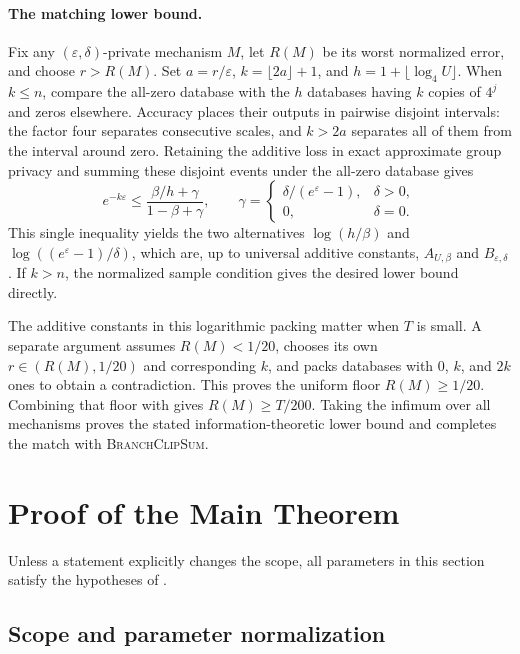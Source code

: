 \documentclass[11pt]{article}
\begin{document}
\paragraph{The matching lower bound.}
Fix any $(\varepsilon,\delta)$-private mechanism $M$, let $R(M)$ be its
worst normalized error, and choose $r>R(M)$.  Set
$a=r/\varepsilon$, $k=\lfloor2a\rfloor+1$, and
$h=1+\lfloor\log_4U\rfloor$.  When $k\le n$, compare the all-zero database
with the $h$ databases having $k$ copies of $4^j$ and zeros elsewhere.
Accuracy places their outputs in pairwise disjoint intervals: the factor
four separates consecutive scales, and $k>2a$ separates all of them from
the interval around zero.  Retaining the additive loss in exact approximate
group privacy and summing these disjoint events under the all-zero database
gives
\begin{equation}
 e^{-k\varepsilon}
 \le\frac{\beta/h+\gamma}{1-\beta+\gamma},
 \qquad
 \gamma=
 \begin{cases}
  \delta/(e^\varepsilon-1),&\delta>0,\\
  0,&\delta=0.
 \end{cases}
 \label{eq:overview-star}
\end{equation}
This single inequality yields the two alternatives
$\log(h/\beta)$ and $\log((e^\varepsilon-1)/\delta)$, which are, up to
universal additive constants, $A_{U,\beta}$ and
$B_{\varepsilon,\delta}$.  If $k>n$, the normalized sample condition gives
the desired lower bound directly.

The additive constants in this logarithmic packing matter when $T$ is
small.  A separate argument assumes $R(M)<1/20$, chooses its own
$r\in(R(M),1/20)$ and corresponding $k$, and packs databases with
$0$, $k$, and $2k$ ones to obtain a contradiction.  This proves the uniform
floor $R(M)\ge1/20$.  Combining that floor with
 gives
$R(M)\ge T/200$.  Taking the infimum over all mechanisms proves the stated
information-theoretic lower bound and completes the match with
\textsc{BranchClipSum}.

\section{Proof of the Main Theorem}
\label{sec:main-proof}

Unless a statement explicitly changes the scope, all parameters in this
section satisfy the hypotheses of .

\subsection{Scope and parameter normalization}
\end{document}
